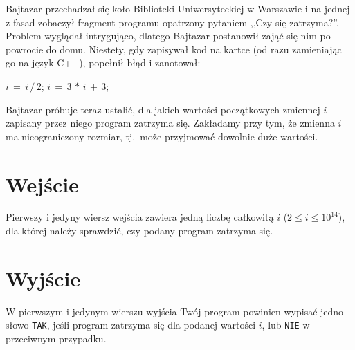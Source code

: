 \documentclass{spiral-kurs}
\begin{document}
\makeheader
%
Bajtazar przechadzał się koło Biblioteki Uniwersyteckiej w Warszawie i na jednej z fasad zobaczył
fragment programu opatrzony pytaniem ,,Czy się zatrzyma?''.
Problem wyglądał intrygująco, dlatego Bajtazar postanowił zająć się nim po powrocie do domu.
Niestety, gdy zapisywał kod na kartce (od razu zamieniając go na język C++), popełnił błąd i zanotował:

\smallskip
\begin{center}
\begin{minipage}{5cm}
\begin{algorithmic}

    \STATE $i\,=\,i\,/\,2$;
 \ELSE
    \STATE $i\,=\,3\,*\,i\,+\,3$;
  \ENDIF

\ENDWHILE
\end{algorithmic}
\end{minipage}
\end{center}
    \smallskip

\noindent
Bajtazar próbuje teraz ustalić, dla jakich wartości początkowych zmiennej $i$ zapisany przez niego program zatrzyma się.
Zakładamy przy tym, że zmienna $i$ ma nieograniczony rozmiar, tj.\ może przyjmować dowolnie duże wartości.

    \section{Wejście}
Pierwszy i jedyny wiersz wejścia zawiera jedną liczbę całkowitą $i$ ($2 \leq i \leq 10^{14}$), dla której
należy sprawdzić, czy podany program zatrzyma się.

    \section{Wyjście}
W pierwszym i jedynym wierszu wyjścia Twój program powinien wypisać jedno słowo \texttt{TAK}, jeśli
program zatrzyma się dla podanej wartości $i$, lub \texttt{NIE} w przeciwnym przypadku.


  
\end{document}

